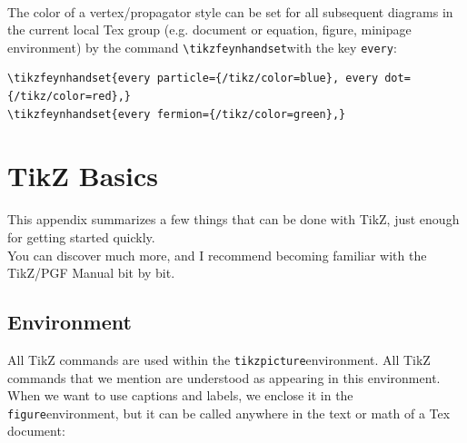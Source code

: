 \documentclass[10pt,letterpaper,twoside,notitlepage]{article}
\numberwithin{figure}{section}
\begin{document}
% 
\setlength{\feynhanddotsize}{1.5mm}
\setlength{\feynhandblobsize}{7.5mm}
\setlength{\feynhandlinesize}{0.5pt}
\setlength{\feynhandarrowsize}{6pt}
\setlength{\feynhandtopsep}{18\feynhandlinesize}
\renewcommand{\feynhandtopsepcolor}{white}
\vspace{-4mm}
\\
The color of a vertex/propagator style can be set for all subsequent diagrams
in the current local Tex group (e.g. document or equation, figure, minipage environment) 
by the command \vercol\verb$\tikzfeynhandset$\txcol with the key \vercol\verb$every$\txcol:
%
\vercol\begin{verbatim}
\tikzfeynhandset{every particle={/tikz/color=blue}, every dot={/tikz/color=red},}
\tikzfeynhandset{every fermion={/tikz/color=green},}
\end{verbatim}\txcol

%
%
\appendix
%	
\section{TikZ Basics}
\label{Apx_tikzbasics}
%
This appendix summarizes a few things that can be done with TikZ,
just enough for getting started quickly.\\
You can discover much more, and I recommend
becoming familiar with the TikZ/PGF Manual \cite{tikz} bit by bit.

\subsection{Environment}
\label{Apx_tikzbasics_environment}
%
\noindent
All TikZ commands are used within the 
\brocol\verb$tikzpicture$\txcol environment.
All TikZ commands that we mention are understood 
as appearing in this environment.
When we want to use captions and labels, we enclose it in the 
\brocol\verb$figure$\txcol environment, but it can be called 
anywhere in the text or math of a Tex document:\\
\end{document}
